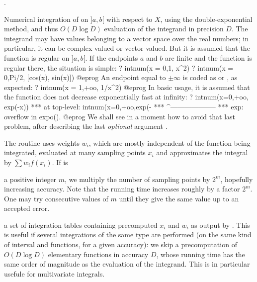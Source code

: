 .

\label{se:intnum}
Numerical integration
of  on $]a,b[$ with respect to $X$, using the
double-exponential method, and thus $O(D\log D)$ evaluation of
the integrand in precision $D$. The integrand may have values
belonging to a vector space over the real numbers; in particular, it can be
complex-valued or vector-valued. But it is assumed that the function is
regular on $]a,b[$. If the endpoints $a$ and $b$ are finite and the
function is regular there, the situation is simple:
\bprog
? intnum(x = 0,1, x^2)
? intnum(x = 0,Pi/2, [cos(x), sin(x)])
@eprog\noindent
An endpoint equal to $\pm\infty$ is coded as  or , as
expected:
\bprog
? intnum(x = 1,+oo, 1/x^2)
@eprog\noindent
In basic usage, it is assumed that the function does not decrease
exponentially fast at infinity:
\bprog
? intnum(x=0,+oo, exp(-x))
  ***   at top-level: intnum(x=0,+oo,exp(-
  ***                 ^--------------------
  *** exp: overflow in expo().
@eprog\noindent
We shall see in a moment how to avoid that last problem, after describing
the last \emph{optional} argument .

The routine uses weights $w_i$, which are mostly independent of the function
being integrated, evaluated at many sampling points $x_i$ and
approximates the integral by $\sum w_i f(x_i)$. If  is

\item a positive integer $m$, we multiply the number of sampling points
by $2^m$, hopefully increasing accuracy. Note that the running time
increases roughly by a factor $2^m$. One may try consecutive values of $m$
until they give the same value up to an accepted error.

\item a set of integration tables containing precomputed $x_i$ and $w_i$
as output by . This is useful if several integrations of
the same type are performed (on the same kind of interval and functions,
for a given accuracy): we skip a precomputation of $O(D\log D)$
elementary functions in accuracy $D$, whose running time has the same order
of magnitude as the evaluation of the integrand. This is in particular
usefule for multivariate integrals.

